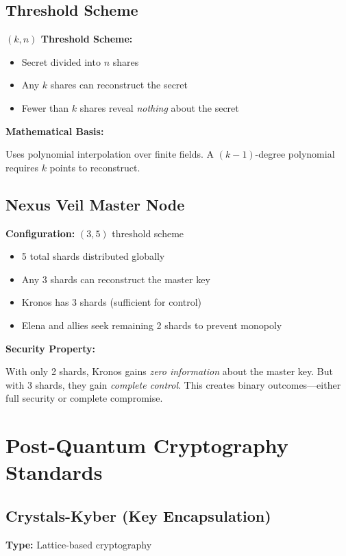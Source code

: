 \documentclass[12pt,oneside]{book}
\begin{document}
\subsection{Threshold Scheme}

\textbf{$(k, n)$ Threshold Scheme:}
\begin{itemize}
\item Secret divided into $n$ shares
\item Any $k$ shares can reconstruct the secret
\item Fewer than $k$ shares reveal \textit{nothing} about the secret
\end{itemize}

\textbf{Mathematical Basis:}

Uses polynomial interpolation over finite fields. A $(k-1)$-degree polynomial requires $k$ points to reconstruct.

\subsection{Nexus Veil Master Node}

\textbf{Configuration:} $(3, 5)$ threshold scheme
\begin{itemize}
\item 5 total shards distributed globally
\item Any 3 shards can reconstruct the master key
\item Kronos has 3 shards (sufficient for control)
\item Elena and allies seek remaining 2 shards to prevent monopoly
\end{itemize}

\textbf{Security Property:}

With only 2 shards, Kronos gains \textit{zero information} about the master key. But with 3 shards, they gain \textit{complete control}. This creates binary outcomes—either full security or complete compromise.

\section{Post-Quantum Cryptography Standards}

\subsection{Crystals-Kyber (Key Encapsulation)}

\textbf{Type:} Lattice-based cryptography
\end{document}
